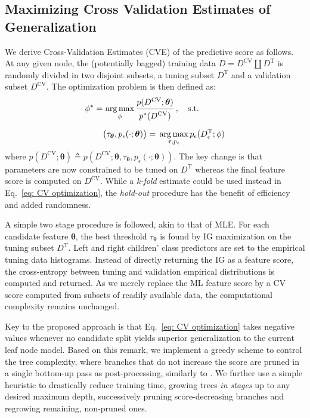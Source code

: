 \subsection{Maximizing Cross Validation Estimates of Generalization}   
\label{sec: CVE}

We derive Cross-Validation Estimates (CVE) of the predictive score as follows. At any given node, the (potentially bagged) training data $D=D^{\text{CV}}\!\coprod\! D^{\text{T}}$ is randomly divided in two disjoint subsets, a tuning subset $D^{\text{T}}$ and a validation subset $D^{\text{CV}}$. The optimization problem is then defined as:
\begin{equation}
\begin{split}
\phi^\ast = & \,\argmax_{\phi} \cfrac{p(D^{\text{CV}};\bm{\theta})}{\raisebox{-0.5ex}{$p^\ast(D^{\text{CV}})$}} \; , \quad \text{s.t. }\\[\medskipamount]
& \big(\tau_{\bm{\theta}}, p_\epsilon(\cdot;\bm{\theta})\big) = \,\argmax_{\tau, p_\epsilon} p_\epsilon(D_\epsilon^{\text{T}};\phi)
\end{split}
\label{eq: CV optimization}
\end{equation}
where $p(D^{\text{CV}};\bm{\theta})\!\triangleq\! p(D^{\text{CV}};\bm{\theta}, \tau_{\bm{\theta}}, p_\epsilon(\cdot;\bm{\theta}))$. The key change is that parameters are now constrained to be tuned on $D^{\text{T}}$ whereas the final feature score is computed on $D^{\text{CV}}$. While a \textit{k-fold} estimate could be used instead in Eq.~\eqref{eq: CV optimization}, the \textit{hold-out} procedure has the benefit of efficiency and added randomness. 

A simple two stage procedure is followed, akin to that of MLE.%
For each candidate feature $\bm{\theta}$, the best threshold $\tau_{\bm{\theta}}$ is found by IG maximization on the tuning subset $D^{\text{T}}$. Left and right children' class predictors are set to the empirical tuning data histograms. Instead of directly returning the IG as a feature score, the cross-entropy between tuning and validation empirical distributions is computed and returned. As we merely replace the ML feature score by a CV score computed from subsets of readily available data, the computational complexity remains unchanged.

Key to the proposed approach is that Eq.~\eqref{eq: CV optimization} takes negative values whenever no candidate split yields superior generalization to the current leaf node model. Based on this remark, we implement a greedy scheme to control the tree complexity, where branches that do not increase the score are pruned in a single bottom-up pass as post-processing, similarly to \cite{quinlan1987simplifying}. We further use a simple heuristic to drastically reduce training time, growing trees \textit{in stages} up to any desired maximum depth, successively pruning score-decreasing branches and regrowing remaining, non-pruned ones.